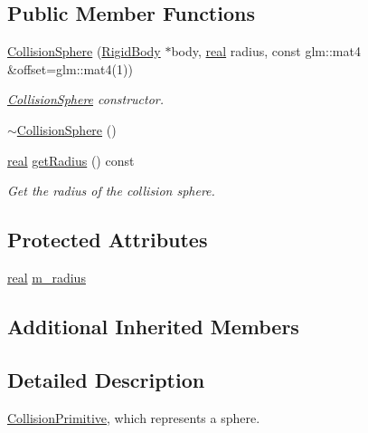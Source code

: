 \subsection*{Public Member Functions}
\begin{DoxyCompactItemize}
\item 
\mbox{\hyperlink{classr3_1_1_collision_sphere_a3b910b66d6b9689da9beba5ec151eba3}{Collision\+Sphere}} (\mbox{\hyperlink{classr3_1_1_rigid_body}{Rigid\+Body}} $\ast$body, \mbox{\hyperlink{namespacer3_ab2016b3e3f743fb735afce242f0dc1eb}{real}} radius, const glm\+::mat4 \&offset=glm\+::mat4(1))
\begin{DoxyCompactList}\small\item\em \mbox{\hyperlink{classr3_1_1_collision_sphere}{Collision\+Sphere}} constructor. \end{DoxyCompactList}\item 
\mbox{\hyperlink{classr3_1_1_collision_sphere_a3605a7afc888411c5fa52179122a8a77}{$\sim$\+Collision\+Sphere}} ()
\item 
\mbox{\hyperlink{namespacer3_ab2016b3e3f743fb735afce242f0dc1eb}{real}} \mbox{\hyperlink{classr3_1_1_collision_sphere_aa3b7687165b34ab82b3bedb0884cc65b}{get\+Radius}} () const
\begin{DoxyCompactList}\small\item\em Get the radius of the collision sphere. \end{DoxyCompactList}\end{DoxyCompactItemize}
\subsection*{Protected Attributes}
\begin{DoxyCompactItemize}
\item 
\mbox{\hyperlink{namespacer3_ab2016b3e3f743fb735afce242f0dc1eb}{real}} \mbox{\hyperlink{classr3_1_1_collision_sphere_abc9e3dcae422b4732a288fa19d89d466}{m\+\_\+radius}}
\end{DoxyCompactItemize}
\subsection*{Additional Inherited Members}


\subsection{Detailed Description}
\mbox{\hyperlink{classr3_1_1_collision_primitive}{Collision\+Primitive}}, which represents a sphere. 

